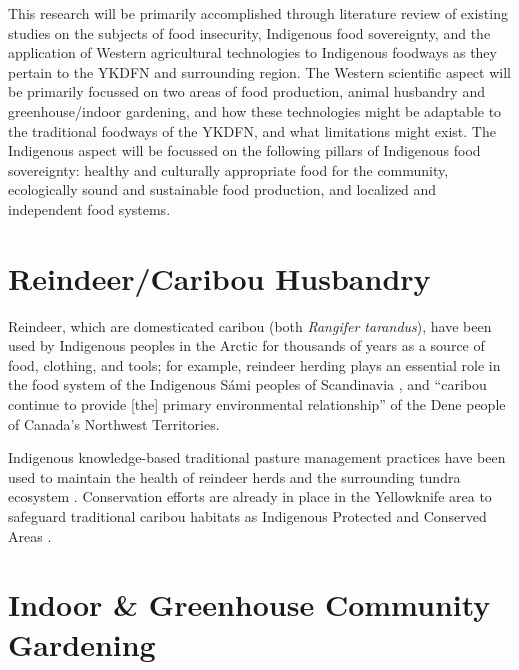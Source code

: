 \documentclass{report}
\begin{document}
\hspace{24pt} This research will be primarily accomplished through literature review of existing studies on the subjects of food insecurity, Indigenous food sovereignty, and the application of Western agricultural technologies to Indigenous foodways as they pertain to the YKDFN and surrounding region.
The Western scientific aspect will be primarily focussed on two areas of food production, animal husbandry and greenhouse/indoor gardening, and how these technologies might be adaptable to the traditional foodways of the YKDFN, and what limitations might exist.
The Indigenous aspect will be focussed on the following pillars of Indigenous food sovereignty: healthy and culturally appropriate food for the community, ecologically sound and sustainable food production, and localized and independent food systems.

\clearpage

\section{Reindeer/Caribou Husbandry}

\hspace{24pt} Reindeer, which are domesticated caribou (both \textit{Rangifer tarandus}), have been used by Indigenous peoples in the Arctic for thousands of years as a source of food, clothing, and tools; for example, reindeer herding plays an essential role in the food system of the Indigenous S\'ami peoples of Scandinavia \parencite{traditionalsiberia}, and ``caribou continue to provide [the] primary environmental relationship'' \parencite[225]{denefoodwaysontologies} of the Dene people of Canada's Northwest Territories.

\hspace{24pt} Indigenous knowledge-based traditional pasture management practices have been used to maintain the health of reindeer herds and the surrounding tundra ecosystem \parencite{reindeerfoodsovereignty}. 
Conservation efforts are already in place in the Yellowknife area to safeguard traditional caribou habitats as Indigenous Protected and Conserved Areas \parencite{resilientcommunities}.

\clearpage

\section{Indoor \& Greenhouse Community Gardening}
\end{document}
